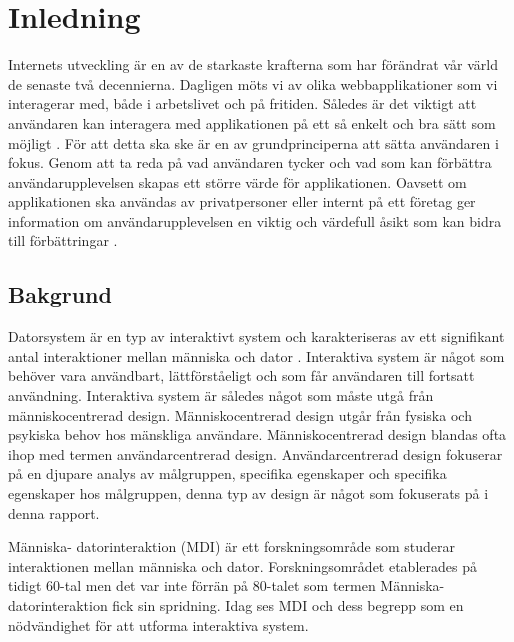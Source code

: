 \section{Inledning}
Internets utveckling är en av de starkaste krafterna som har förändrat vår värld de senaste två decennierna\cite{Davidsson2017Svenskarna2017}. Dagligen möts vi av olika webbapplikationer som vi interagerar med, både i arbetslivet och på fritiden\cite{Six2011TheUXmatters}. Således är det viktigt att användaren kan interagera med applikationen på ett så enkelt och bra sätt som möjligt \cite{Six2011TheUXmatters}. För att detta ska ske är en av grundprinciperna att sätta användaren i fokus\cite{Six2011TheUXmatters}. Genom att ta reda på vad användaren tycker och vad som kan förbättra användarupplevelsen skapas ett större värde för applikationen\cite{Rodden2010MeasuringApplications}. Oavsett om applikationen ska användas av privatpersoner eller internt på ett företag ger information om användarupplevelsen en viktig och värdefull åsikt som kan bidra till förbättringar \cite{Rodden2010MeasuringApplications}.
\newline

\parindent
\parskip

\subsection{Bakgrund}
Datorsystem är en typ av interaktivt system och karakteriseras av ett signifikant antal interaktioner mellan människa och dator \cite{InteractiveDictionary}. Interaktiva system är något som behöver vara användbart, lättförståeligt och som får användaren till fortsatt användning\cite{May2012ApplyingApp}. Interaktiva system är således något som måste utgå från människocentrerad design\cite{Human-CenteredStudio}. Människocentrerad design utgår från fysiska och psykiska behov hos mänskliga användare\cite{Millot2014Human-CenteredDesign}. Människocentrerad design blandas ofta ihop med termen användarcentrerad design\cite{Abras2004User-CenteredDesign}. Användarcentrerad design fokuserar på en djupare analys av målgruppen, specifika egenskaper och specifika egenskaper hos målgruppen, denna typ av design är något som fokuserats på i denna rapport.
\newline

Människa- datorinteraktion (MDI) är ett forskningsområde som studerar interaktionen mellan människa och dator\cite{Blanton2009Human-ComputerInteraction}. Forskningsområdet etablerades på tidigt 60-tal men det var inte förrän på 80-talet som termen Människa- datorinteraktion fick sin spridning\cite{Myers1998ATechnology}. Idag ses MDI och dess begrepp som en nödvändighet för att utforma interaktiva system\cite{TheCambridge}. 
\newline

